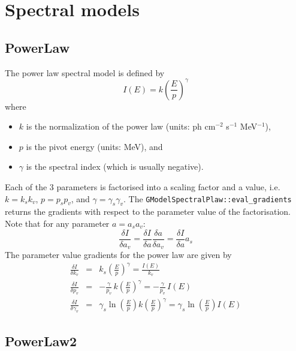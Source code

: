 \documentclass{article}[12pt,a4]
\begin{document}
\section{Spectral models}

\subsection{PowerLaw}

The power law spectral model is defined by
\begin{equation}
I(E) = k \left( \frac{E}{p} \right)^{\gamma}
\end{equation}
where
\begin{itemize}
\item $k$ is the normalization of the power law (units: ph cm$^{-2}$ s$^{-1}$ MeV$^{-1}$),
\item $p$ is the pivot energy (units: MeV), and
\item $\gamma$ is the spectral index (which is usually negative).
\end{itemize}

Each of the 3 parameters is factorised into a scaling factor and a value, i.e.
$k=k_s k_v$, $p=p_s p_v$, and $\gamma = \gamma_s \gamma_v$.
The {\tt GModelSpectralPlaw::eval\_gradients} returns the gradients with
respect to the parameter value of the factorisation.
Note that for any parameter $a=a_s a_v$:
\begin{equation}
\frac{\delta I}{\delta a_v} = \frac{\delta I}{\delta a} \frac{\delta a}{\delta a_v} =
  \frac{\delta I}{\delta a} a_s
\end{equation}
The parameter value gradients for the power law are given by
\begin{eqnarray}
\frac{\delta I}{\delta k_v} & = & 
  k_s \left( \frac{E}{p} \right)^{\gamma} = \frac{I(E)}{k_v} \\
\frac{\delta I}{\delta p_v} & = & 
  -\frac{\gamma}{p_v} \, k \left( \frac{E}{p} \right)^{\gamma} =
  -\frac{\gamma}{p_v} \, I(E) \\
\frac{\delta I}{\delta \gamma_v} & = &
  \gamma_s \ln \left( \frac{E}{p} \right) k \left( \frac{E}{p} \right)^{\gamma} =
  \gamma_s \ln \left( \frac{E}{p} \right) I(E)
\end{eqnarray}


\subsection{PowerLaw2}
\end{document}
